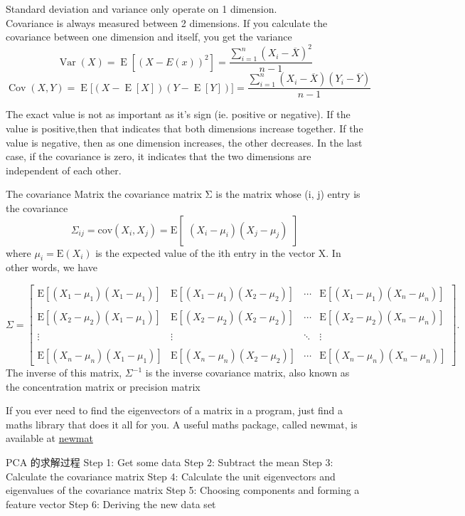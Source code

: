 \documentclass[openany]{book}
\begin{document}
Standard deviation and variance only operate on 1 dimension.\\
Covariance is always measured between 2 dimensions. If you calculate the covariance between one dimension and itself, you get the variance
$$ \operatorname{Var}(X) = \operatorname{E}\left[(X - E(x))^2 \right] = \dfrac{\sum_{i=1}^n (X_i - \overline{X})^2}{n-1} $$
$$ \operatorname{Cov}(X,Y) = \operatorname{E}{\big[(X - \operatorname{E}[X])(Y - \operatorname{E}[Y])\big]} =  \dfrac{\sum_{i=1}^n (X_i - \overline{X})(Y_i - \overline{Y})}{n-1} $$

The exact value is not as important as it’s sign (ie. positive or negative). 
If the value is positive,then that indicates that both dimensions increase together.
If the value is negative, then as one dimension increases, the other decreases.
In the last case, if the covariance is zero, it indicates that the two dimensions are independent of each other.

The covariance Matrix
the covariance matrix Σ is the matrix whose (i, j) entry is the covariance
$$
\Sigma_{ij}
= \mathrm{cov}(X_i, X_j) = \mathrm{E}\begin{bmatrix}
(X_i - \mu_i)(X_j - \mu_j)
\end{bmatrix}
$$
where $\mu_i = \mathrm{E}(X_i)$ is the expected value of the ith entry in the vector X. In other words, we have

$$
\Sigma
= \begin{bmatrix}
 \mathrm{E}[(X_1 - \mu_1)(X_1 - \mu_1)] & \mathrm{E}[(X_1 - \mu_1)(X_2 - \mu_2)] & \cdots & \mathrm{E}[(X_1 - \mu_1)(X_n - \mu_n)] \\ \\
 \mathrm{E}[(X_2 - \mu_2)(X_1 - \mu_1)] & \mathrm{E}[(X_2 - \mu_2)(X_2 - \mu_2)] & \cdots & \mathrm{E}[(X_2 - \mu_2)(X_n - \mu_n)] \\ \\
 \vdots & \vdots & \ddots & \vdots \\ \\
 \mathrm{E}[(X_n - \mu_n)(X_1 - \mu_1)] & \mathrm{E}[(X_n - \mu_n)(X_2 - \mu_2)] & \cdots & \mathrm{E}[(X_n - \mu_n)(X_n - \mu_n)]
\end{bmatrix}.
$$
The inverse of this matrix, $\Sigma^{-1}$ is the inverse covariance matrix, also known as the concentration matrix or precision matrix

If you ever need to find the eigenvectors of a matrix in a program, just find a maths library that does it all for you.  A useful maths package, called newmat, is available at \href{http://webnz.com/robert/}{newmat}

PCA 的求解过程
Step 1: Get some data
Step 2: Subtract the mean
Step 3: Calculate the covariance matrix
Step 4: Calculate the unit eigenvectors and eigenvalues of the covariance matrix
Step 5: Choosing components and forming a feature vector
Step 6: Deriving the new data set
\end{document}
